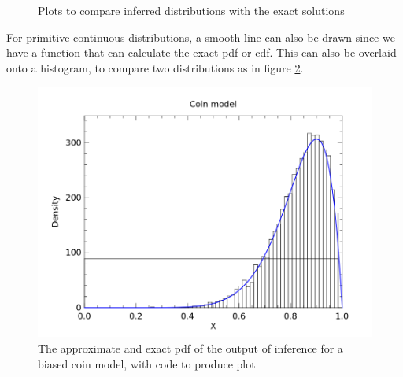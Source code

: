 \begin{figure}[!htb]
	\centering
	\qquad
	\caption{Plots to compare inferred distributions with the exact solutions}
	\label{fig:vis-qq}
\end{figure}
				
For primitive continuous distributions, a smooth line can also be drawn since we have a function that can calculate the exact pdf or cdf. This can also be overlaid onto a histogram, to compare two distributions as in figure \ref{fig:vis-samples}.
				
\begin{figure}[!htb]
	\centering														
	\begin{minipage}{0.45\textwidth}
		\centering
	\end{minipage}
	\begin{minipage}{0.45\textwidth}
		\centering
		\includegraphics[width=\linewidth]{figs/coin_compare.png}
	\end{minipage}
	\caption{The approximate and exact pdf of the output of inference for a biased coin model, with code to produce plot}
	\label{fig:vis-samples}
\end{figure}
				
